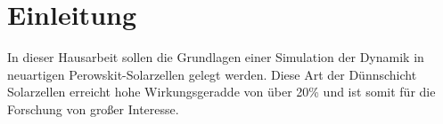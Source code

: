 \chapter{Einleitung}
In dieser Hausarbeit sollen die Grundlagen einer Simulation der Dynamik in neuartigen Perowskit-Solarzellen gelegt werden. Diese Art der Dünnschicht Solarzellen erreicht hohe Wirkungsgeradde von über  20\% und ist somit für die Forschung von großer Interesse.  



